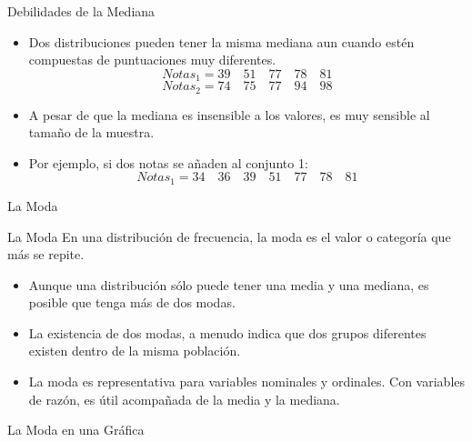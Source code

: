 \documentclass[xcolor=dvipsnames]{beamer}
\begin{document}
	\begin{frame}{Debilidades de la Mediana}
		\begin{itemize}
			\justifying
			\item Dos distribuciones pueden tener la misma mediana aun cuando estén compuestas de puntuaciones muy diferentes.
			$$Notas_1= 39 \quad 51 \quad 77 \quad 78 \quad 81$$
			$$Notas_2= 74 \quad 75 \quad 77 \quad 94 \quad 98$$
			\item A pesar de que la mediana es insensible a los valores, es muy sensible al tamaño de la muestra. 
			\item Por ejemplo, si dos notas se añaden al conjunto 1:
			$$Notas_1= 34 \quad 36 \quad 39 \quad 51 \quad 77 \quad 78 \quad 81$$
		\end{itemize}
	\end{frame}
	
	\begin{frame}{La Moda}
		\begin{block}{La Moda}
			En una distribución de frecuencia, la moda es el valor o categoría que más se repite. 
		\end{block}
		
		\begin{itemize}
			\justifying
			\item Aunque una distribución sólo puede tener una media y una mediana, es posible que tenga más de dos modas.
			\item La existencia de dos modas, a menudo indica que dos grupos diferentes existen dentro de la misma población.
			\item La moda es representativa para variables nominales y ordinales. Con variables de razón, es útil acompañada de la media y la mediana.
		\end{itemize}
	\end{frame}
	
	\begin{frame}{La Moda en una Gráfica}
		\begin{center}
			
		\end{center}
	\end{frame}
	
\end{document}
